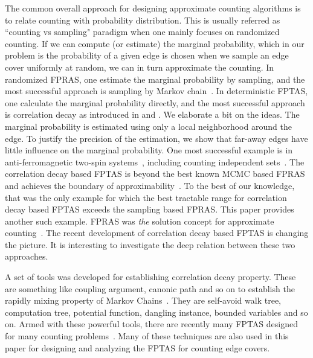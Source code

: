 The common overall approach for designing approximate counting algorithms is to relate counting with probability distribution.
 This is usually referred as ``counting vs sampling" paradigm when one mainly focuses on randomized counting.  If we can compute (or estimate) the marginal probability, which in our problem is the probability of a given edge is chosen when we sample an edge cover uniformly at random, we can in turn approximate  the counting. In randomized FPRAS, one estimate the marginal probability by sampling, and the most successful approach is sampling by Markov chain~\cite{MC_JA96}.
In deterministic FPTAS, one calculate the marginal probability directly, and the most successful approach is correlation decay as introduced in \cite{BG08} and \cite{Weitz06}. We elaborate a bit on the ideas.
 The marginal probability is estimated using only a local neighborhood around the edge. To justify the precision of the estimation, we show that far-away edges have little influence on the marginal probability.
One most successful example is in anti-ferromagnetic two-spin systems~\cite{LLY12,SST,LLY13}, including counting independent sets~\cite{Weitz06}. The correlation decay based FPTAS is beyond the best known MCMC based FPRAS and achieves the boundary of approximability~\cite{SS12,galanis2012inapproximability}.
To the best of our knowledge, that was the only example for which the best tractable range for correlation decay based FPTAS exceeds the sampling based FPRAS. This paper provides another such example. FPRAS was \emph{the} solution concept for approximate counting~\cite{dich_DGGJ00}. The recent development of correlation decay based FPTAS is changing the picture. It is interesting to investigate the deep relation between these two approaches.

A set of tools was developed for establishing correlation decay property. These are something like coupling argument, canonic path and so on to establish the rapidly mixing property of Markov Chains~\cite{MC_JA96}.
They are self-avoid walk tree, computation tree, potential function, dangling instance, bounded variables and so on. Armed with these powerful tools, there are recently many FPTAS designed for many counting problems~\cite{LLY12,SST,LLY13,YZ13,fibo-approx}.
Many of these techniques are also used in this paper for designing and analyzing the FPTAS for counting edge covers.

